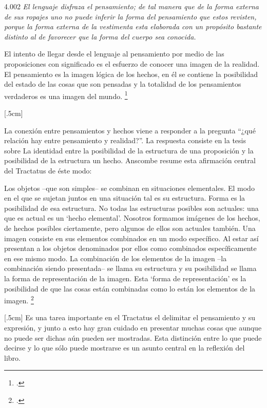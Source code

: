 \documentclass[../main.tex]{subfiles}
\begin{document}
4.002 \emph{El lenguaje disfraza el pensamiento; de tal manera que de la forma externa de sus ropajes uno no puede inferir la forma del pensamiento que estos revisten, porque la forma externa de la vestimenta esta elaborada con un propósito bastante distinto al de favorecer que la forma del cuerpo sea conocida.}

El intento de llegar desde el lenguaje al pensamiento por medio de las proposiciones con significado es el esfuerzo de conocer una imagen de la realidad. El pensamiento es la imagen lógica de los hechos, en él se contiene la posibilidad del estado de las cosas que son pensadas y la totalidad de los pensamientos verdaderos es una imagen del mundo. \footcite[cf. 3 y 3.001]{tractatus}

[.5cm]

La conexión entre pensamientos y hechos viene a responder a la pregunta ``¿qué relación hay entre pensamiento y realidad?''. La respuesta consiste en la tesis sobre La identidad entre la posibilidad de la estructura de una proposición y la posibilidad de la estructura un hecho. Anscombe resume esta afirmación central del Tractatus de éste modo:

Los objetos --que son simples-- se combinan en situaciones elementales. El modo en el que se sujetan juntos en una situación tal es su estructura. Forma es la posibilidad de esa estructura. No todas las estructuras posibles son actuales: una que es actual es un `hecho elemental'. Nosotros formamos imágenes de los hechos, de hechos posibles ciertamente, pero algunos de ellos son actuales también. Una imagen consiste en sus elementos combinados en un modo específico. Al estar así presentan a los objetos denominados por ellos como combinados específicamente en ese mismo modo. La combinación de los elementos de la imagen --la combinación siendo presentada-- se llama su estructura y su posibilidad se llama la forma de representación de la imagen. 
Esta `forma de representación' es la posibilidad de que las cosas están combinadas como lo están los elementos de la imagen. \footcite[p. 171]{simplicity}

[.5cm]
Es una tarea importante en el Tractatus el delimitar el pensamiento y su expresión, y junto a esto hay gran cuidado en presentar muchas cosas que aunque no puede ser dichas aún pueden ser mostradas. Esta distinción entre lo que puede decirse y lo que sólo puede mostrarse es un asunto central en la reflexión del libro. 
\end{document}

